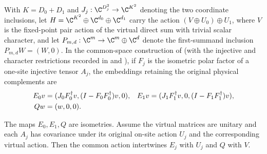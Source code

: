 \begin{definition}
    \label{def:spt_common_physical_endpoints}
    \leanok
    With $K=D_0+D_1$ and $J_j:\C^{D_j^2}\to\C^{K^2}$ denoting the
    two coordinate inclusions, let
    $H=\C^{K^2}\oplus\C^{d_0}\oplus\C^{d_1}$ carry the action
    $(V\oplus U_0)\oplus U_1$, where $V$ is the fixed-point pair
    action of the virtual direct sum with trivial scalar character, and let
    $P_{m,d}:\C^m\to\C^m\oplus\C^d$ denote the first-summand
    inclusion $P_{m,d}W=(W,0)$.
    In the common-space construction of
    \cite[Section~II.F.2]{Schuch2011Phases} (with the injective and
    character restrictions recorded in
    \cite{gap:spc11_uniform_gap_injective_scope} and
    \cite{gap:rmp_spt_fixed_point_trivial_character}), if $F_j$ is the
    isometric polar factor of a one-site injective tensor $A_j$, the
    embeddings retaining the original physical complements are
    \begin{align}
        E_0v & =(J_0F_0^\dagger v,(I-F_0F_0^\dagger)v,0),       &
        E_1v & =(J_1F_1^\dagger v,0,(I-F_1F_1^\dagger)v),\notag   \\
        Qw   & =(w,0,0).\notag
    \end{align}
\end{definition}

\begin{lemma}
    \label{thm:spt_common_physical_endpoints}
    \leanok
    The maps $E_0,E_1,Q$ are isometries. Assume the virtual matrices
    are unitary and each $A_j$ has covariance under its original
    on-site action $U_j$ and the corresponding virtual action.
    Then the common action intertwines $E_j$ with $U_j$ and $Q$ with $V$.
\end{lemma}

